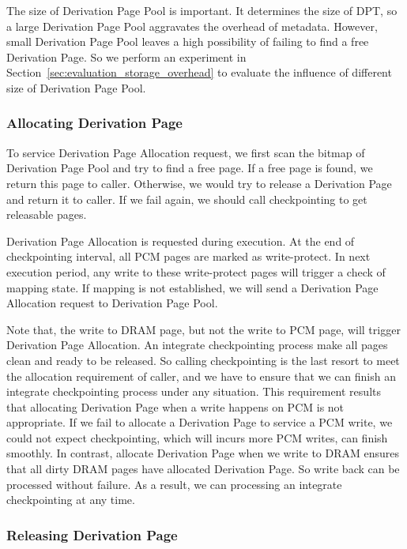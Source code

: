 \documentclass[conference]{IEEEtran}
\begin{document}
The size of Derivation Page Pool is important.
It determines the size of DPT, so a large Derivation Page Pool aggravates the overhead of metadata.
However, small Derivation Page Pool leaves a high possibility of failing to find a free Derivation Page.
So we perform an experiment in Section~\ref{sec:evaluation_storage_overhead} to evaluate the influence of different size of Derivation Page Pool.

\subsubsection{Allocating Derivation Page}

To service Derivation Page Allocation request, we first scan the bitmap of Derivation Page Pool and try to find a free page.
If a free page is found, we return this page to caller.
Otherwise, we would try to release a Derivation Page and return it to caller.
If we fail again, we should call checkpointing to get releasable pages.

Derivation Page Allocation is requested during execution.
At the end of checkpointing interval, all PCM pages are marked as write-protect.
In next execution period, any write to these write-protect pages will trigger a check of mapping state.
If mapping is not established, we will send a Derivation Page Allocation request to Derivation Page Pool.

Note that, the write to DRAM page, but not the write to PCM page, will trigger Derivation Page Allocation.
An integrate checkpointing process make all pages clean and ready to be released.
So calling checkpointing is the last resort to meet the allocation requirement of caller, and we have to ensure that we can finish an integrate checkpointing process under any situation.
This requirement results that allocating Derivation Page when a write happens on PCM is not appropriate.
If we fail to allocate a Derivation Page to service a PCM write, we could not expect checkpointing, which will incurs more PCM writes, can finish smoothly.
In contrast, allocate Derivation Page when we write to DRAM ensures that all dirty DRAM pages have allocated Derivation Page.
So write back can be processed without failure.
As a result, we can processing an integrate checkpointing at any time.

\subsubsection{Releasing Derivation Page}
\end{document}
